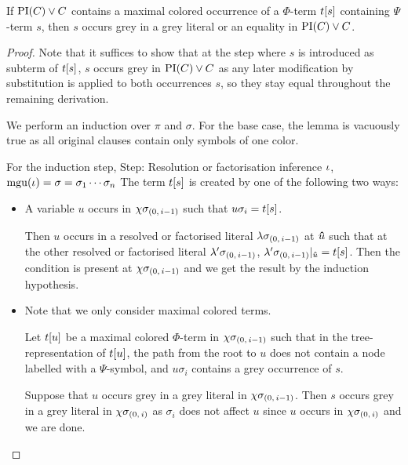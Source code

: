 \documentclass[,%
	draft=false,%
	numbers=noendperiod
	12pt,
	a4paper,
	oneside,%
	openany,
]{memoir}
\newcommand{\inv}{\ensuremath{\chi}}
\begin{document}
\begin{lemma}
	\label{lemma:subterm_in_grey_lit}
	If ${\operatorname{PI}(C) \lor C}$ contains a maximal colored occurrence of a $\Phi$-term $t[s]$ containing $\Psi$-term $s$, then 
	$s$ occurs grey in a grey literal or an equality in $\operatorname{PI}(C) \lor C$.
\end{lemma}
\begin{proof}
	Note that it suffices to show that at the step where $s$ is introduced as subterm of $t[s]$, $s$ occurs grey in $\operatorname{PI}(C) \lor C$ as any later modification by substitution is applied to both occurrences $s$, so they stay equal throughout the remaining derivation.

	We perform an induction over $\pi$ and $\sigma$. 
	For the base case, the lemma is vacuously true as all original clauses contain only symbols of one color.

	For the induction step,
	Step:
	Resolution or factorisation inference $\iota$, $\operatorname{mgu}(\iota) = \sigma = \sigma_1\cdots\sigma_n$ 
	The term $t[s]$ is created by one of the following two ways: 

	\begin{itemize}
		\item
			A variable $u$ occurs in $\inv\sigmazmi$ such that $u\sigma_i = t[s]$.

			Then $u$ occurs in a resolved or factorised literal $\lambda\sigma_{(0,\,i-1)}$ at $\bm\hat u$ such that at the other resolved or factorised literal $\lambda'\sigma_{(0,\,i-1)}$, $\lambda'\sigma_{(0,\,i-1)}|_{\bm\hat u} = t[s]$.
			Then the condition is present at $\inv\sigmazmi$ and we get the result by the induction hypothesis.

		\item 
			Note that we only consider maximal colored terms.

			Let $t[u]$ be a maximal colored $\Phi$-term in $\inv\sigmazmi$ such that in the tree-representation of $t[u]$, the path from the root to $u$ does not contain a node labelled with a $\Psi$-symbol, and $u\sigma_i$ contains a grey occurrence of $s$.


			Suppose that $u$ occurs grey in a grey literal in $\inv\sigmazmi$.
			Then $s$ occurs grey in a grey literal in $\inv\sigmazi$ as $\sigma_i$ does not affect $u$ since $u$ occurs in $\inv\sigmazi$ and we are done.


\end{itemize}
\end{proof}
\end{document}
